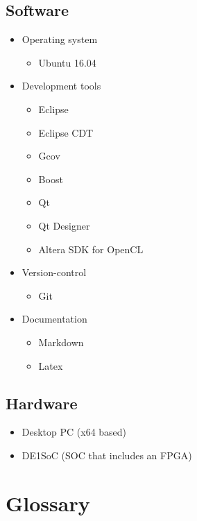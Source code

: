 \documentclass[parskip=full]{scrartcl}
\begin{document}
\subsection {Software}

\begin{itemize}
	\item Operating system
	\begin{itemize}
		\item Ubuntu 16.04
	\end{itemize}
	\item Development tools
	\begin{itemize}
		\item Eclipse
		\item Eclipse CDT
		\item Gcov
		\item Boost
		\item Qt
		\item Qt Designer
		\item Altera SDK for OpenCL
	\end{itemize}
	\item Version-control
	\begin{itemize}
		\item Git
	\end{itemize}
	\item Documentation
	\begin{itemize}
		\item Markdown
		\item Latex
	\end{itemize}
\end{itemize}

\subsection {Hardware}

\begin{itemize}
	\item Desktop PC (x64 based)
	\item DE1SoC (SOC that includes an FPGA)
\end{itemize}

\pagebreak





\section{Glossary}
\end{document}
